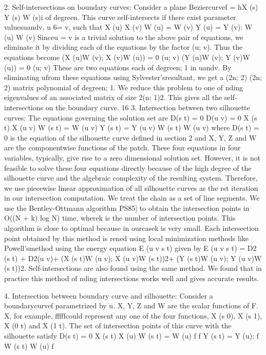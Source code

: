 \documentclass[11pt,letterpaper]{article}
\begin{document}
2. Self-intersections on boundary curves: Consider a plane Beziercurvef = hX (s) Y (s) W (s)i of degreen. This curve self-intersects if there exist parameter valuesuandv, u 6= v, such that X (u) X (v) W (u) = W (v) Y (u) = Y (v): W (u) W (v) Sinceu = v is a trivial solution to the above pair of equations, we eliminate it by dividing each of the equations by the factor (u; v). Thus the equations become (X (u)W (v); X (v)W (u)) = 0 (u; v) (Y (u)W (v); Y (v)W (u)) = 0 (u; v) These are two equations each of degreen; 1 in uandv. By eliminating ufrom these equations using Sylvester'sresultant, we get a (2n; 2) (2n; 2) matrix polynomial of degreen; 1. We reduce this problem to one of nding eigenvalues of an associated matrix of size 2(n; 1)2. This gives all the self-intersections on the boundary curve. 16 3. Intersection between two silhouette curves: The equations governing the solution set are D(s t) = 0 D(u v) = 0 X (s t) X (u v) W (s t) = W (u v) Y (s t) = Y (u v) W (s t) W (u v) where D(s t) = 0 is the equation of the silhouette curve defined in section 2 and X, Y, Z and W are the componentwise functions of the patch. These four equations in four variables, typically, give rise to a zero dimensional solution set. However, it is not feasible to solve these four equations directly because of the high degree of the silhouette curve and the algebraic complexity of the resulting system. Therefore, we use piecewise linear approximation of all silhouette curves as the rst iteration in our intersection computation. We treat the chain as a set of line segments. We use the Bentley-Ottmann algorithm PS85] to obtain the intersection points in O((N + k) log N) time, wherek is the number of intersection points. This algorithm is close to optimal because in ourcasek is very small. Each intersection point obtained by this method is rened using local minimization methods like Powell'smethod using the energy equation E (u v s t) given by E (u v s t) = D2 (s t) + D2(u v)+ (X (s t)W (u v); X (u v)W (s t))2+ (Y (s t)W (u v); Y (u v)W (s t))2. Self-intersections are also found using the same method. We found that in practice this method of nding intersections works well and gives accurate results.

4. Intersection between boundary curve and silhouette: Consider a boundarycurvef parametrized by u. X, Y, Z and W are the scalar functions of F. X, for example, fffffcould represent any one of the four functions, X (s 0), X (s 1), X (0 t) and X (1 t). The set of intersection points of this curve with the silhouette satisfy D(s t) = 0 X (s t) X (u) W (s t) = W (u) f f Y (s t) = Y (u): f W (s t) W (u) f
\end{document}
